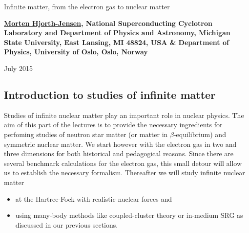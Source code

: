 \documentclass[%
oneside,                 %
final,                   %
10pt]{article}
\begin{document}






\thispagestyle{empty}

\begin{center}
{\LARGE\bf
\begin{spacing}{1.25}
Infinite matter, from the electron gas to nuclear matter
\end{spacing}
}
\end{center}


\begin{center}
{\bf \href{{http://computationalphysics.no}}{Morten Hjorth-Jensen}, National Superconducting Cyclotron Laboratory and Department of Physics and Astronomy, Michigan State University, East Lansing, MI 48824, USA {\&} Department of Physics, University of Oslo, Oslo, Norway${}^{}$} \\ [0mm]
\end{center}

\begin{center}
\end{center}
    

\begin{center} %
July 2015
\end{center}

\vspace{1cm}


\tableofcontents


\vspace{1cm} %




\subsection*{Introduction to studies of infinite matter}


Studies of infinite nuclear matter play an important role  in nuclear physics. The aim of this part of the lectures is to provide the necessary ingredients for perfoming studies of neutron star matter (or matter in $\beta$-equilibrium) and symmetric nuclear matter. We start however with the electron gas in two and three dimensions for both historical and pedagogical reasons. Since there are several benchmark calculations for the electron gas, this small detour will allow us to establish the necessary formalism. Thereafter we will study infinite nuclear matter 
\begin{itemize}
\item at the Hartree-Fock with realistic nuclear forces and

\item using many-body methods like coupled-cluster theory or in-medium SRG as discussed in our previous sections.
\end{itemize}
\end{document}
